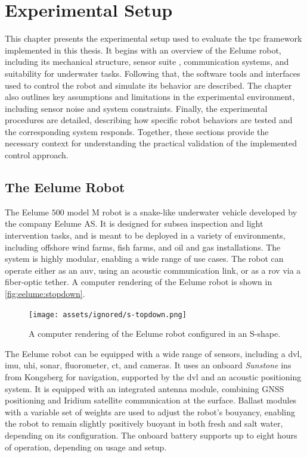 \chapter{Experimental Setup}

This chapter presents the experimental setup used to evaluate the 
\gls{tpc} framework implemented in this thesis. It begins with an 
overview of the Eelume robot, including its mechanical structure, sensor suite
, communication systems, and suitability for underwater tasks. 
Following that, the software tools and interfaces used to control the robot 
and simulate its behavior are described. The chapter also outlines key 
assumptions and limitations in the experimental environment, including sensor 
noise and system constraints. 
Finally, the experimental procedures are detailed, describing how specific 
robot behaviors are tested and the corresponding system responds.
Together, these sections provide the necessary context 
for understanding the practical validation of the implemented control approach.

\section{The Eelume Robot}

The Eelume \(500\) model M robot is a snake-like underwater vehicle developed by 
the company Eelume AS. It is designed for subsea inspection and light 
intervention tasks, and is meant to be deployed in a variety of environments, 
including offshore wind farms, fish farms, and oil and gas installations. The 
system is highly modular, enabling a wide range of use cases.
The robot can operate either as an \gls{auv}, using an acoustic communication 
link, or as a \gls{rov} via a fiber-optic tether. A computer rendering of the 
Eelume robot is shown in \autoref{fig:eelume:stopdown}.

\begin{figure}[h!]
    \centering
    \texttt{[image: assets/ignored/s-topdown.png]}
    \caption{A computer rendering of the Eelume robot configured in an S-shape.}
    \label{fig:eelume:stopdown}
\end{figure}

The Eelume robot can be equipped with a wide range of sensors, including a \gls{dvl},
\gls{imu}, \gls{uhi}, sonar, fluorometer, \gls{ct}, and 
cameras. It uses an onboard \textit{Sunstone} \gls{ins} from Kongsberg for navigation, supported by the \gls{dvl}
and an acoustic positioning system.
It is equipped with an integrated antenna module, combining GNSS positioning and Iridium satellite communication at the surface.
Ballast modules with a variable set of weights are used to adjust the robot's bouyancy,
enabling the robot to remain slightly 
positively buoyant in both fresh and salt water, depending on its configuration.
The onboard battery supports up to eight hours of operation, depending on 
usage and setup.

